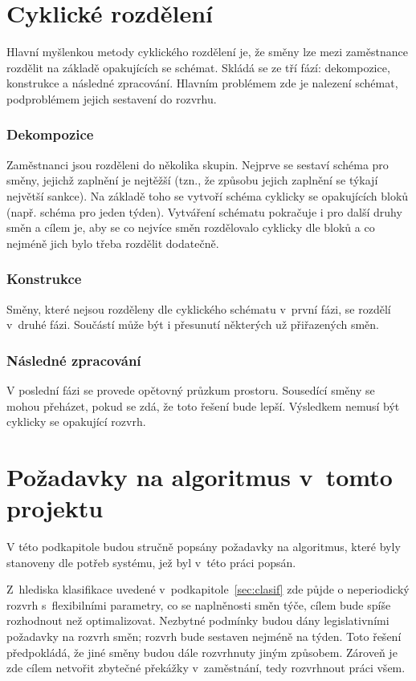 \documentclass[twoside]{ctuthesis}
\begin{document}
\begin{enumerate}[label=\textbf{O\arabic*.}]
\section{Cyklické rozdělení}
Hlavní myšlenkou metody cyklického rozdělení je, že směny lze mezi zaměstnance rozdělit na základě opakujících se schémat. Skládá se ze tří fází: dekompozice, konstrukce a následné zpracování. \cite{brucker2005decomposition} Hlavním problémem zde je nalezení schémat, podproblémem jejich sestavení do rozvrhu. \cite{becker2020decomposition}

\subsubsection{Dekompozice}
Zaměstnanci jsou rozděleni do několika skupin. Nejprve se sestaví schéma pro směny, jejichž zaplnění je nejtěžší (tzn., že způsobu jejich zaplnění se týkají největší sankce). Na základě toho se vytvoří schéma cyklicky se opakujících bloků (např. schéma pro jeden týden). Vytváření schématu pokračuje i pro další druhy směn a cílem je, aby se co nejvíce směn rozdělovalo cyklicky dle bloků a co nejméně jich bylo třeba rozdělit dodatečně.

\subsubsection{Konstrukce}
Směny, které nejsou rozděleny dle cyklického schématu v~první fázi, se rozdělí v~druhé fázi. Součástí může být i přesunutí některých už přiřazených směn.

\subsubsection{Následné zpracování}
V poslední fázi se provede opětovný průzkum prostoru. Sousedící směny se mohou přeházet, pokud se zdá, že toto řešení bude lepší. Výsledkem nemusí být cyklicky se opakující rozvrh.

\newpage

\section{Požadavky na algoritmus v~tomto projektu}
V této podkapitole budou stručně popsány požadavky na algoritmus, které byly stanoveny dle potřeb systému, jež byl v~této práci popsán.

Z~hlediska klasifikace uvedené v~podkapitole~\ref{sec:clasif} zde půjde o neperiodický rozvrh s~flexibilními parametry, co se naplněnosti směn týče, cílem bude spíše rozhodnout než optimalizovat. Nezbytné podmínky budou dány legislativními požadavky na rozvrh směn; rozvrh bude sestaven nejméně na týden. Toto řešení předpokládá, že jiné směny budou dále rozvrhnuty jiným způsobem. Zároveň je zde cílem netvořit zbytečné překážky v~zaměstnání, tedy rozvrhnout práci všem.


\end{enumerate}
\end{document}
